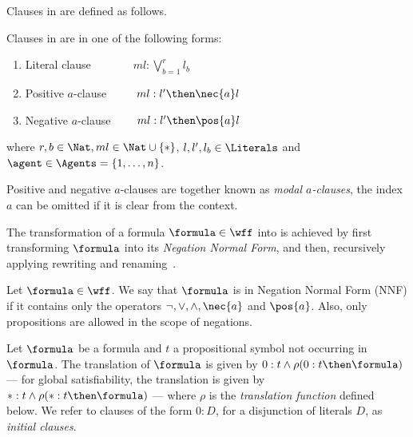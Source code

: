 Clauses in  are defined as follows.

\begin{definition}
    Clauses in  are in one of the following forms:
    \begin{enumerate}
        \item Literal clause $\ \ \quad \qquad ml : \bigvee^r_{b=1} l_b$
        \item Positive $a$-clause $\ \qquad ml : l' \then \nec{a} l$
        \item Negative $a$-clause $\qquad ml : l' \then \pos{a} l$
    \end{enumerate}
    where $r, b \in \Nat, ml \in \Nat \cup \{*\}$, $l, l', l_b \in
    \Literals$ and $\agent \in \Agents = \{1, \ldots, n\}$.
\end{definition}

Positive and negative $a$-clauses are together known as \emph{modal
$a$-clauses}, the index $a$ can be omitted if it is clear from the context.

The transformation of a formula $\formula \in \wff$ into  is achieved
by first transforming $\formula$ into its \emph{Negation Normal Form}, and then,
recursively applying rewriting and renaming~\cite{plaisted1986structure}.

\begin{definition}
    Let $\formula \in \wff$. We say that $\formula$ is in Negation Normal Form (NNF) if
    it contains only the operators $\neg, \lor, \land, \nec{a}$ and $\pos{a}$. Also,
    only propositions are allowed in the scope of negations.
\end{definition}

Let $\formula$ be a formula and $t$ a propositional symbol not occurring in
$\formula$. The translation of $\formula$ is given by $0 : t \land \rho(0 : t
\then \formula)$ --- for global satisfiability, the translation is given by $* :
t \land \rho(* : t \then \formula)$ --- where $\rho$ is the \emph{translation
function} defined below. We refer to clauses of the form $0 : D$, for a
disjunction of literals $D$, as \emph{initial clauses}. 

